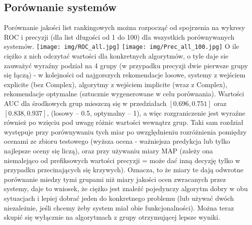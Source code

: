 \documentclass{pracamgr}
\begin{document}
   \subsection{Porównanie systemów}
    Porównanie jakości list rankingowych można rozpocząć od spojrzenia na wykresy ROC i precyzji (dla list długości od 1 do 100)
    dla wszystkich porównywanych systemów.\newline
    \texttt{[image: img/ROC\_all.jpg]}
    \texttt{[image: img/Prec\_all\_100.jpg]}\newline
    O ile ciężko z nich odczytać wartości dla konkretnych algorytmów, o tyle daje sie zauważyć wyraźny podział na 4 grupy
    (w przypadku precyzji dwie pierwsze grupy się łączą) - w kolejności od najgorszych
    rekomendacje losowe, systemy z wejściem explicite (bez Complex), algorytmy z wejściem implicite (wraz z Complex), rekomendacje optymalne
    (sztucznie wygenerowane w celu porównania). Wartości AUC dla środkowych grup mieszczą się w przedziałach $[0.696,0.751]$ oraz $[0.838,0.937]$,
    (losowy -- 0.5, optymalny -- 1), a więc rozgraniczenie jest wyraźne również po wzięciu pod uwagę różnic wartości wewnątrz grup.
    Taki sam rozdział występuje przy porównywaniu tych miar po uwzględnieniu rozróżnienia pomiędzy ocenami
    ze zbioru testowego (wyższa ocena - ważniejsza predykcja lub tylko najlepsze oceny się liczą), oraz przy używaniu miary MAP
    (zależy ona niemalejąco od prefiksowych wartości precyzji = może dać inną decyzję tylko w przypadku przecinających się krzywych).
    Oznacza, to że miary te dają odwrotne porównanie miedzy tymi grupami niż miary jakości ocen zwracanych przez systemy, daje to wniosek,
    że ciężko jest znaleźć pojedynczy algorytm dobry w obu sytuacjach i lepiej dobrać jeden do konkretnego problemu
    (lub używać dwóch niezależnie, jeśli chcemy żeby system miał obie funkcjonalności).
    Można teraz skupić się wyłącznie na algorytmach z grupy otrzymującej lepsze wyniki.\newpage
\end{document}
